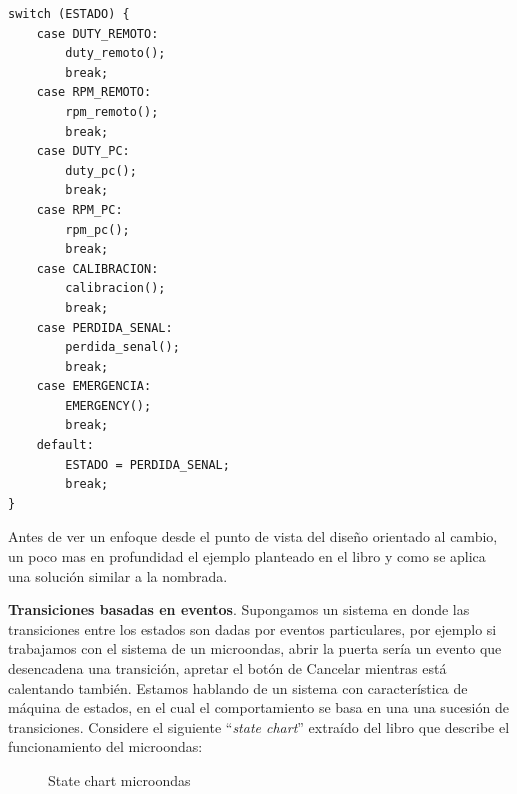 \begin{lstlisting}[caption=Main loop del previo firmware del robot desmalezador, label={codigoLoopMain}]
switch (ESTADO) {
	case DUTY_REMOTO:
		duty_remoto();
		break;
	case RPM_REMOTO:
		rpm_remoto();
		break;
	case DUTY_PC:
		duty_pc();
		break;
	case RPM_PC:
		rpm_pc();
		break;	
	case CALIBRACION:
		calibracion();
		break;
	case PERDIDA_SENAL:
		perdida_senal();
		break;
	case EMERGENCIA:
		EMERGENCY();
		break;
	default:
		ESTADO = PERDIDA_SENAL;
		break;
}
\end{lstlisting}

Antes de ver un enfoque desde el punto de vista del diseño orientado al cambio, un poco mas en profundidad el ejemplo planteado en el libro y como se aplica una solución similar a la nombrada.

\textbf{Transiciones basadas en eventos}. Supongamos un sistema en donde las transiciones entre los estados son dadas por eventos particulares, por ejemplo si trabajamos con el sistema de un microondas, abrir la puerta sería un evento que desencadena una transición, apretar el botón de Cancelar mientras está calentando también. Estamos hablando de un sistema con característica de máquina de estados, en el cual el comportamiento se basa en una una sucesión de transiciones. Considere el siguiente ``\textit{state chart}'' extraído del libro que describe el funcionamiento del microondas:


\begin{figure}[h]
\caption{State chart microondas}
\begin{center}
\end{center}
\end{figure}

